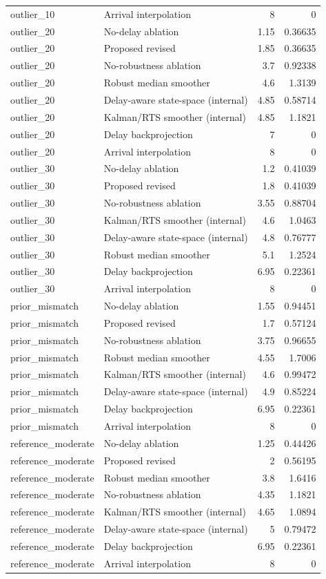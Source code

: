 \begin{table}[!htbp]
{\begin{tabular}{llrr}
outlier_10 & Arrival interpolation & 8 & 0 \\
outlier_20 & No-delay ablation & 1.15 & 0.36635 \\
outlier_20 & Proposed revised & 1.85 & 0.36635 \\
outlier_20 & No-robustness ablation & 3.7 & 0.92338 \\
outlier_20 & Robust median smoother & 4.6 & 1.3139 \\
outlier_20 & Delay-aware state-space (internal) & 4.85 & 0.58714 \\
outlier_20 & Kalman/RTS smoother (internal) & 4.85 & 1.1821 \\
outlier_20 & Delay backprojection & 7 & 0 \\
outlier_20 & Arrival interpolation & 8 & 0 \\
outlier_30 & No-delay ablation & 1.2 & 0.41039 \\
outlier_30 & Proposed revised & 1.8 & 0.41039 \\
outlier_30 & No-robustness ablation & 3.55 & 0.88704 \\
outlier_30 & Kalman/RTS smoother (internal) & 4.6 & 1.0463 \\
outlier_30 & Delay-aware state-space (internal) & 4.8 & 0.76777 \\
outlier_30 & Robust median smoother & 5.1 & 1.2524 \\
outlier_30 & Delay backprojection & 6.95 & 0.22361 \\
outlier_30 & Arrival interpolation & 8 & 0 \\
prior_mismatch & No-delay ablation & 1.55 & 0.94451 \\
prior_mismatch & Proposed revised & 1.7 & 0.57124 \\
prior_mismatch & No-robustness ablation & 3.75 & 0.96655 \\
prior_mismatch & Robust median smoother & 4.55 & 1.7006 \\
prior_mismatch & Kalman/RTS smoother (internal) & 4.6 & 0.99472 \\
prior_mismatch & Delay-aware state-space (internal) & 4.9 & 0.85224 \\
prior_mismatch & Delay backprojection & 6.95 & 0.22361 \\
prior_mismatch & Arrival interpolation & 8 & 0 \\
reference_moderate & No-delay ablation & 1.25 & 0.44426 \\
reference_moderate & Proposed revised & 2 & 0.56195 \\
reference_moderate & Robust median smoother & 3.8 & 1.6416 \\
reference_moderate & No-robustness ablation & 4.35 & 1.1821 \\
reference_moderate & Kalman/RTS smoother (internal) & 4.65 & 1.0894 \\
reference_moderate & Delay-aware state-space (internal) & 5 & 0.79472 \\
reference_moderate & Delay backprojection & 6.95 & 0.22361 \\
reference_moderate & Arrival interpolation & 8 & 0 \\
\bottomrule
\end{tabular}
}
\end{table}
